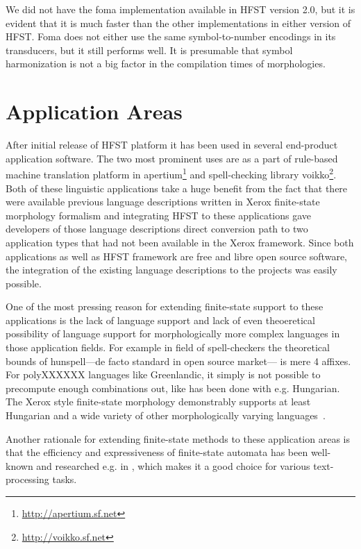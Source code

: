 \documentclass{llncs}
\begin{document}
We did not have the foma implementation available in HFST version 2.0,
but it is evident that it is much faster than the other
implementations in either version of HFST. Foma does not either use
the same symbol-to-number encodings in its transducers, but it still
performs well. It is presumable that symbol harmonization is not a big
factor in the compilation times of morphologies. 


\section{Application Areas}

After initial release of HFST platform it has been used in several end-product
application software. The two most prominent uses are as a part of rule-based
machine translation platform in apertium\footnote{\url{http://apertium.sf.net}}
and spell-checking library voikko\footnote{\url{http://voikko.sf.net}}. Both of
these linguistic applications take a huge benefit from the fact that there
were available previous language descriptions written in Xerox finite-state
morphology formalism and integrating HFST to these applications gave
developers of those language descriptions direct conversion path to two
application types that had not been available in the Xerox framework. Since
both applications as well as HFST framework are free and libre open source
software, the integration of the existing language descriptions to the
projects was easily possible.

One of the most pressing reason for extending finite-state support to these
applications is the lack of language support and lack of even theoeretical
possibility of language support for morphologically more complex languages
in those application fields. For example in field of spell-checkers the
theoretical bounds of hunspell---de facto standard in open source market---
is mere 4 affixes. For polyXXXXXX languages like Greenlandic, it simply is
not possible to precompute enough combinations out, like has been done with
e.g. Hungarian. The Xerox style finite-state morphology demonstrably supports
at least Hungarian and a wide variety of other morphologically varying
languages~\cite{beesley/2003}.

Another rationale for extending finite-state methods to these application areas
is that the efficiency and expressiveness of finite-state automata has been
well-known and researched e.g. in \cite{aho/2007}, which makes it a good choice
for various text-processing tasks.
\end{document}
